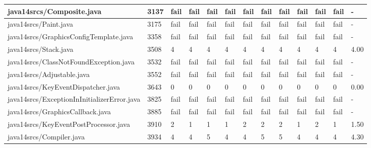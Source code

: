 \begin{tabular}{|l|l|l|l|l|l|l|l|l|l|l|l|l|}
\hline
java14srcs/Composite.java                          & 3137        & fail      & fail      & fail      & fail      & fail      & fail      & fail      & fail      & fail      & fail      & -         \\
\hline
java14srcs/Paint.java                              & 3175        & fail      & fail      & fail      & fail      & fail      & fail      & fail      & fail      & fail      & fail      & -         \\
\hline
java14srcs/GraphicsConfigTemplate.java             & 3358        & fail      & fail      & fail      & fail      & fail      & fail      & fail      & fail      & fail      & fail      & -         \\
\hline
java14srcs/Stack.java                              & 3508        & 4         & 4         & 4         & 4         & 4         & 4         & 4         & 4         & 4         & 4         & 4.00      \\
\hline
java14srcs/ClassNotFoundException.java             & 3532        & fail      & fail      & fail      & fail      & fail      & fail      & fail      & fail      & fail      & fail      & -         \\
\hline
java14srcs/Adjustable.java                         & 3552        & fail      & fail      & fail      & fail      & fail      & fail      & fail      & fail      & fail      & fail      & -         \\
\hline
java14srcs/KeyEventDispatcher.java                 & 3643        & 0         & 0         & 0         & 0         & 0         & 0         & 0         & 0         & 0         & 0         & 0.00      \\
\hline
java14srcs/ExceptionInInitializerError.java        & 3825        & fail      & fail      & fail      & fail      & fail      & fail      & fail      & fail      & fail      & fail      & -         \\
\hline
java14srcs/GraphicsCallback.java                   & 3885        & fail      & fail      & fail      & fail      & fail      & fail      & fail      & fail      & fail      & fail      & -         \\
\hline
java14srcs/KeyEventPostProcessor.java              & 3910        & 2         & 1         & 1         & 1         & 2         & 2         & 2         & 1         & 2         & 1         & 1.50      \\
\hline
java14srcs/Compiler.java                           & 3934        & 4         & 4         & 5         & 4         & 4         & 5         & 5         & 4         & 4         & 4         & 4.30      \\

\end{tabular}

